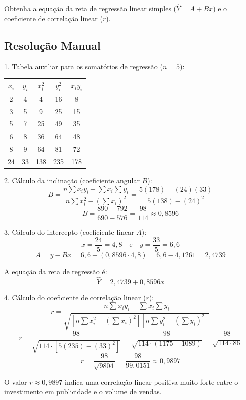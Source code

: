 Obtenha a equação da reta de regressão linear simples ($\hat{Y} = A + Bx$) e o coeficiente de correlação linear ($r$).

\subsection*{Resolução Manual}

1. Tabela auxiliar para os somatórios de regressão ($n = 5$):

\begin{table}[H]
    \centering
    \begin{tabular}{|c|c|c|c|c|}
        \hline
        $x_i$ & $y_i$ & $x_i^2$ & $y_i^2$ & $x_i y_i$ \\ \hline
        2 & 4 & 4  & 16 & 8   \\
        3 & 5 & 9  & 25 & 15  \\
        5 & 7 & 25 & 49 & 35  \\
        6 & 8 & 36 & 64 & 48  \\
        8 & 9 & 64 & 81 & 72  \\ \hline
        24 & 33 & 138 & 235 & 178 \\ \hline
    \end{tabular}
\end{table}

2. Cálculo da inclinação (coeficiente angular $B$):
\[
B = \frac{n \sum x_i y_i - \sum x_i \sum y_i}{n \sum x_i^2 - (\sum x_i)^2} = \frac{5(178) - (24)(33)}{5(138) - (24)^2}
\]
\[
B = \frac{890 - 792}{690 - 576} = \frac{98}{114} \approx 0{,}8596
\]

3. Cálculo do intercepto (coeficiente linear $A$):
\[
\bar{x} = \frac{24}{5} = 4{,}8 \quad \text{e} \quad \bar{y} = \frac{33}{5} = 6{,}6
\]
\[
A = \bar{y} - B \bar{x} = 6{,}6 - (0{,}8596 \cdot 4{,}8) = 6{,}6 - 4{,}1261 = 2{,}4739
\]

A equação da reta de regressão é:
\[
\hat{Y} = 2{,}4739 + 0{,}8596x
\]

4. Cálculo do coeficiente de correlação linear ($r$):
\[
r = \frac{n \sum x_i y_i - \sum x_i \sum y_i}{\sqrt{\left[ n \sum x_i^2 - (\sum x_i)^2 \right] \left[ n \sum y_i^2 - (\sum y_i)^2 \right]}}
\]
\[
r = \frac{98}{\sqrt{114 \cdot \left[ 5(235) - (33)^2 \right]}} = \frac{98}{\sqrt{114 \cdot (1175 - 1089)}} = \frac{98}{\sqrt{114 \cdot 86}}
\]
\[
r = \frac{98}{\sqrt{9804}} = \frac{98}{99{,}0151} \approx 0{,}9897
\]

O valor $r \approx 0{,}9897$ indica uma correlação linear positiva muito forte entre o investimento em publicidade e o volume de vendas.

